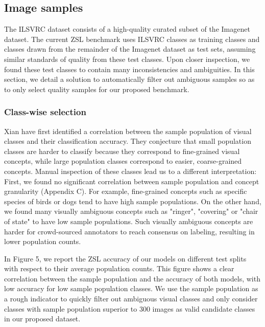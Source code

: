 \subsection{Image samples}
The ILSVRC dataset consists of a high-quality curated subset of the Imagenet dataset.
The current ZSL benchmark uses ILSVRC classes as training classes and classes drawn from the remainder of the Imagenet dataset as test sets,
assuming similar standards of quality from these test classes.
Upon closer inspection, we found these test classes to contain many inconsistencies and ambiguities.
In this section, we detail a solution to automatically filter out ambiguous samples so as 
to only select quality samples for our proposed benchmark.

\subsubsection{Class-wise selection}
Xian \etal \cite{xian2016latent} have first identified a correlation between the sample population of visual classes and their classification accuracy.
They conjecture that small population classes are harder to classify because they correspond to fine-grained visual concepts,
while large population classes correspond to easier, coarse-grained concepts. 
Manual inspection of these classes lead us to a different interpretation:
First, we found no significant correlation between sample population and concept granularity (Appendix C).
For example, fine-grained concepts such as specific species of birds or dogs tend to have high sample populations.
On the other hand, we found many visually ambiguous concepts such as "ringer", "covering" or "chair of state" to have low sample populations.
Such visually ambiguous concepts are harder for crowd-sourced annotators to reach consensus on labeling, resulting in lower population counts.

In Figure 5, we report the ZSL accuracy of our models on different test splits with respect to their average population counts.
This figure shows a clear correlation between the sample population and the accuracy of both models, 
with low accuracy for low sample population classes.
We use the sample population as a rough indicator to quickly filter out ambiguous visual classes and 
only consider classes with sample population superior to 300 images as valid candidate classes in our proposed dataset.


